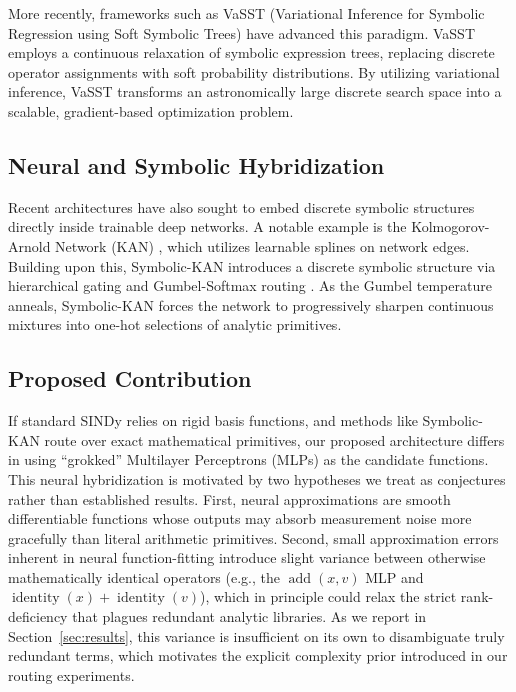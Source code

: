 \documentclass[conference]{IEEEtran}
\begin{document}
More recently, frameworks such as VaSST (Variational Inference for Symbolic Regression using Soft Symbolic Trees) \cite{b9} have advanced this paradigm. VaSST employs a continuous relaxation of symbolic expression trees, replacing discrete operator assignments with soft probability distributions. By utilizing variational inference, VaSST transforms an astronomically large discrete search space into a scalable, gradient-based optimization problem.

\subsection{Neural and Symbolic Hybridization}
Recent architectures have also sought to embed discrete symbolic structures directly inside trainable deep networks. A notable example is the Kolmogorov-Arnold Network (KAN) \cite{b6}, which utilizes learnable splines on network edges. Building upon this, Symbolic-KAN \cite{b10} introduces a discrete symbolic structure via hierarchical gating and Gumbel-Softmax routing \cite{b7}. As the Gumbel temperature anneals, Symbolic-KAN forces the network to progressively sharpen continuous mixtures into one-hot selections of analytic primitives.

\subsection{Proposed Contribution}
If standard SINDy relies on rigid basis functions, and methods like Symbolic-KAN route over exact mathematical primitives, our proposed architecture differs in using ``grokked'' Multilayer Perceptrons (MLPs) \cite{b2} as the candidate functions. This neural hybridization is motivated by two hypotheses we treat as conjectures rather than established results. First, neural approximations are smooth differentiable functions whose outputs may absorb measurement noise more gracefully than literal arithmetic primitives. Second, small approximation errors inherent in neural function-fitting introduce slight variance between otherwise mathematically identical operators (e.g., the $\operatorname{add}(x,v)$ MLP and $\operatorname{identity}(x) + \operatorname{identity}(v)$), which in principle could relax the strict rank-deficiency that plagues redundant analytic libraries. As we report in Section~\ref{sec:results}, this variance is insufficient on its own to disambiguate truly redundant terms, which motivates the explicit complexity prior introduced in our routing experiments.
\end{document}
